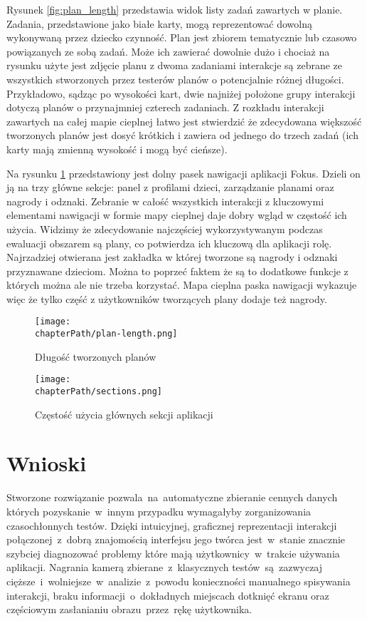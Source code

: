 Rysunek \ref{fig:plan_length} przedstawia widok listy zadań zawartych w planie. Zadania, przedstawione jako białe karty, mogą reprezentować dowolną wykonywaną przez dziecko czynność. Plan jest zbiorem tematycznie lub czasowo powiązanych ze sobą zadań. Może ich zawierać dowolnie dużo i chociaż na rysunku użyte jest zdjęcie planu z dwoma zadaniami interakcje są zebrane ze wszystkich stworzonych przez testerów planów o potencjalnie różnej długości. Przykładowo, sądząc po wysokości kart, dwie najniżej położone grupy interakcji dotyczą planów o przynajmniej czterech zadaniach. Z rozkładu interakcji zawartych na całej mapie cieplnej łatwo jest stwierdzić że zdecydowana większość tworzonych planów jest dosyć krótkich i zawiera od jednego do trzech zadań (ich karty mają zmienną wysokość i mogą być cieńsze).

Na rysunku \ref{fig:sections_usage} przedstawiony jest dolny pasek nawigacji aplikacji Fokus. Dzieli on ją na trzy główne sekcje: panel z profilami dzieci, zarządzanie planami oraz nagrody i odznaki. Zebranie w całość wszystkich interakcji z kluczowymi elementami nawigacji w formie mapy cieplnej daje dobry wgląd w częstość ich użycia. Widzimy że zdecydowanie najczęściej wykorzystywanym podczas ewaluacji obszarem są plany, co potwierdza ich kluczową dla aplikacji rolę. Najrzadziej otwierana jest zakładka w której tworzone są nagrody i odznaki przyznawane dzieciom. Można to poprzeć faktem że są to dodatkowe funkcje z których można ale nie trzeba korzystać. Mapa cieplna paska nawigacji wykazuje więc że tylko część z użytkowników tworzących plany dodaje też nagrody.

\bigskip
\begin{figure}[H]
\centering
\begin{minipage}{.4\textwidth}
	\centering
	\texttt{[image: \\chapterPath/plan-length.png]}
	\bigskip
	\caption{Długość tworzonych planów}
	\label{fig:plan_length}
\end{minipage}
\begin{minipage}{.55\textwidth}
	\centering
	\texttt{[image: \\chapterPath/sections.png]}
	\bigskip
	\caption{Częstość użycia głównych sekcji aplikacji}
	\label{fig:sections_usage}
\end{minipage}
\end{figure}

\section{Wnioski}
Stworzone rozwiązanie pozwala~na~automatyczne zbieranie cennych danych których pozyskanie~w~innym przypadku wymagałyby zorganizowania czasochłonnych testów. Dzięki intuicyjnej, graficznej reprezentacji interakcji połączonej~z~dobrą znajomością interfejsu jego twórca jest~w~stanie znacznie szybciej diagnozować problemy które mają użytkownicy~w~trakcie używania aplikacji. Nagrania kamerą zbierane~z~klasycznych testów~są~zazwyczaj cięższe~i~wolniejsze~w~analizie~z~powodu konieczności manualnego spisywania interakcji, braku informacji~o~dokładnych miejscach dotknięć ekranu oraz częściowym zasłanianiu obrazu~przez~rękę użytkownika. 

